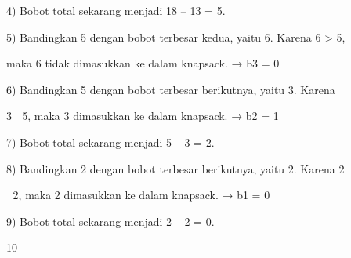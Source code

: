 \documentclass{article}
\begin{document}

4) Bobot total sekarang menjadi 18 – 13 = 5.

5) Bandingkan 5 dengan bobot terbesar kedua, yaitu 6. Karena 6 > 5, 

maka 6 tidak dimasukkan ke dalam knapsack. → b3 = 0

6) Bandingkan 5 dengan bobot terbesar berikutnya, yaitu 3.  Karena 

3  5, maka 3 dimasukkan ke dalam knapsack. → b2 = 1

7) Bobot total sekarang menjadi 5 – 3 = 2.

8) Bandingkan 2 dengan bobot terbesar berikutnya, yaitu 2. Karena 2 

 2, maka 2 dimasukkan ke dalam knapsack. → b1 = 0

9) Bobot total sekarang menjadi 2 – 2 = 0.

10
\end{document}
